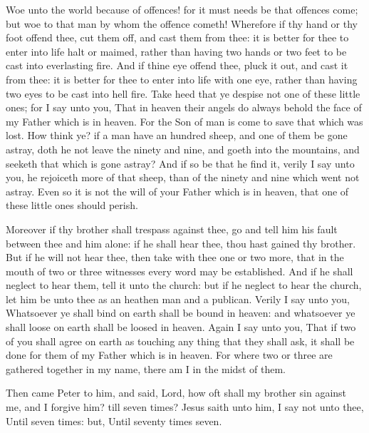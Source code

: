  Woe unto the world because of offences! for it must needs
be that offences come; but woe to that man by whom the offence cometh!
 Wherefore if thy hand or thy foot offend thee, cut them
off, and cast them from thee: it is better for thee to enter into life
halt or maimed, rather than having two hands or two feet to be cast into
everlasting fire.  And if thine eye offend thee, pluck it
out, and cast it from thee: it is better for thee to enter into life
with one eye, rather than having two eyes to be cast into hell fire.
 Take heed that ye despise not one of these little ones;
for I say unto you, That in heaven their angels do always behold the
face of my Father which is in heaven.  For the Son of man
is come to save that which was lost.  How think ye? if a
man have an hundred sheep, and one of them be gone astray, doth he not
leave the ninety and nine, and goeth into the mountains, and seeketh
that which is gone astray?  And if so be that he find it,
verily I say unto you, he rejoiceth more of that sheep, than of the
ninety and nine which went not astray.  Even so it is not
the will of your Father which is in heaven, that one of these little
ones should perish.

 Moreover if thy brother shall trespass against thee, go
and tell him his fault between thee and him alone: if he shall hear
thee, thou hast gained thy brother.  But if he will not
hear thee, then take with thee one or two more, that in the mouth of two
or three witnesses every word may be established.  And if
he shall neglect to hear them, tell it unto the church: but if he
neglect to hear the church, let him be unto thee as an heathen man and a
publican.  Verily I say unto you, Whatsoever ye shall
bind on earth shall be bound in heaven: and whatsoever ye shall loose on
earth shall be loosed in heaven.  Again I say unto you,
That if two of you shall agree on earth as touching any thing that they
shall ask, it shall be done for them of my Father which is in heaven.
 For where two or three are gathered together in my name,
there am I in the midst of them.

 Then came Peter to him, and said, Lord, how oft shall my
brother sin against me, and I forgive him? till seven times?
 Jesus saith unto him, I say not unto thee, Until seven
times: but, Until seventy times seven.

